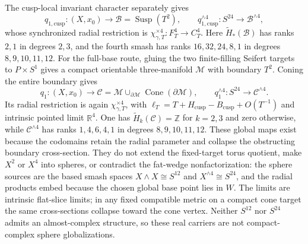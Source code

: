 \begin{itemize}[leftmargin=1.8em]
The cusp-local invariant character separately gives
\[
 q_{1,\mathrm{cusp}}:(X,x_0)\longrightarrow
 \mathcal B=\operatorname{Susp}(T^2),
 \qquad
 q_{1,\mathrm{cusp}}^{\wedge4}:S^{24}
 \longrightarrow\mathcal B^{\wedge4},
\]
whose synchronized radial restriction is
$\chi_{\gamma,T}^{\times4}:F_T^4\to C_T^4$.  Here
$\widetilde H_*(\mathcal B)$ has ranks $2,1$ in degrees $2,3$, and the
fourth smash has ranks $16,32,24,8,1$ in degrees $8,9,10,11,12$.
For the full-base route, gluing the two finite-filling Seifert targets to
$P\times S^1$ gives a compact orientable three-manifold $\mathcal M$ with
boundary $T^2$.  Coning the entire boundary gives
\[
 q_1:(X,x_0)\longrightarrow
 \mathcal C=\mathcal M\cup_{\partial\mathcal M}
             \operatorname{Cone}(\partial\mathcal M),
 \qquad
 q_1^{\wedge4}:S^{24}\longrightarrow\mathcal C^{\wedge4}.
\]
Its radial restriction is again $\chi_{\gamma,T}^{\times4}$, with
$\ell_T=T+H_{\mathrm{cusp}}-B_{\mathrm{cusp}}+O(T^{-1})$ and intrinsic
pointed limit $\mathbb R^4$.
One has $\widetilde H_k(\mathcal C)=\mathbb Z$ for $k=2,3$ and zero
otherwise, while $\mathcal C^{\wedge4}$ has ranks $1,4,6,4,1$ in degrees
$8,9,10,11,12$.  These global maps exist because the codomains retain the
radial parameter and collapse the obstructing boundary cross-section.
They do not extend the fixed-target torus quotient, make $X^2$ or $X^4$
into spheres, or contradict the fat-wedge nonfactorization: the sphere
sources are the based smash spaces $X\wedge X\cong S^{12}$ and
$X^{\wedge4}\cong S^{24}$, and the radial products embed because the
chosen global base point lies in $W$.  The limits are intrinsic flat-slice
limits; in any fixed compatible metric on a compact cone target the same
cross-sections collapse toward the cone vertex.  Neither $S^{12}$ nor
$S^{24}$ admits an almost-complex structure, so these real carriers are
not compact-complex sphere globalizations.


\end{itemize}
